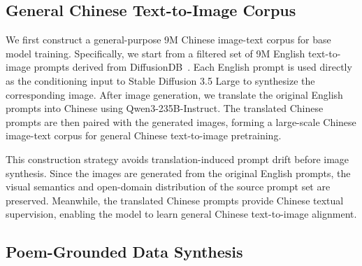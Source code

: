 

\subsection{General Chinese Text-to-Image Corpus}

We first construct a general-purpose 9M Chinese image-text corpus for base model training. Specifically, we start from a filtered set of 9M English text-to-image prompts derived from DiffusionDB~\cite{wang2022diffusiondb}. Each English prompt is used directly as the conditioning input to Stable Diffusion 3.5 Large to synthesize the corresponding image. After image generation, we translate the original English prompts into Chinese using Qwen3-235B-Instruct. The translated Chinese prompts are then paired with the generated images, forming a large-scale Chinese image-text corpus for general Chinese text-to-image pretraining. 

This construction strategy avoids translation-induced prompt drift before image synthesis. Since the images are generated from the original English prompts, the visual semantics and open-domain distribution of the source prompt set are preserved. Meanwhile, the translated Chinese prompts provide Chinese textual supervision, enabling the model to learn general Chinese text-to-image alignment.

\subsection{Poem-Grounded Data Synthesis}

